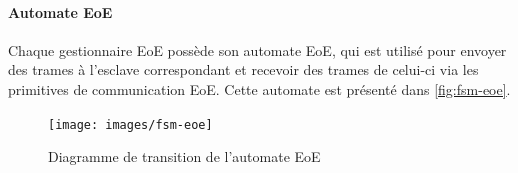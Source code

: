\documentclass[a4paper,12pt,BCOR=6mm,bibtotoc,idxtotoc]{scrbook}
\begin{document}
\paragraph{Automate EoE}

Chaque gestionnaire EoE poss\`ede son automate EoE, qui est utilis\'e pour
envoyer des trames \`a l'esclave correspondant et recevoir des trames
de celui-ci via les primitives de communication EoE. Cette automate
est pr\'esent\'e dans \autoref{fig:fsm-eoe}.

\begin{figure}[htbp]
  \centering
  \texttt{[image: images/fsm-eoe]} %
  \caption{Diagramme de transition de l'automate EoE}
  \label{fig:fsm-eoe}
\end{figure}

\end{document}
